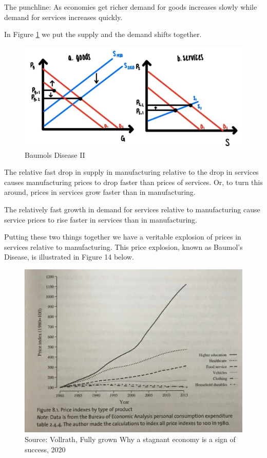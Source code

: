 \documentclass[
]{book}
\begin{document}
The punchline: As economies get richer demand for goods increases slowly while demand for services increases quickly.

In Figure \ref{fig:fig513} we put the supply and the demand shifts together.

\begin{figure}

{\centering \includegraphics[width=1\linewidth]{img/ch5/fig13} 

}

\caption{Baumols Disease II}\label{fig:fig513}
\end{figure}

The relative fast drop in supply in manufacturing relative to the drop in services causes manufacturing prices to drop faster than prices of services. Or, to turn this around, prices in services grow faster than in manufacturing.

The relatively fast growth in demand for services relative to manufacturing cause service prices to rise faster in services than in manufacturing.

Putting these two things together we have a veritable explosion of prices in services relative to manufacturing. This price explosion, known as Baumol's Disease, is illustrated in Figure 14 below.

\begin{figure}

{\centering \includegraphics[width=1\linewidth]{img/ch5/fig14} 

}

\caption{Source: Vollrath, Fully grown Why a stagnant economy is a sign of success, 2020 }\label{fig:fig514}
\end{figure}
\end{document}
